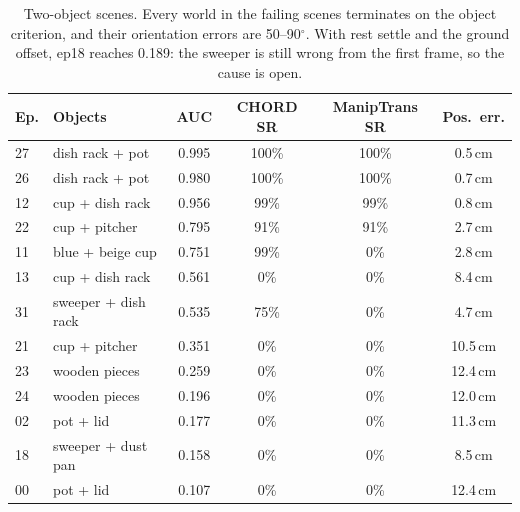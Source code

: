 \documentclass[10pt,a4paper]{article}
\begin{document}
\begin{table}[!htb]
\centering\small
\begin{tabular}{llcccc}
\toprule
Ep. & Objects & AUC & CHORD SR & ManipTrans SR & Pos.\ err.\\
\midrule
27 & dish rack + pot & \textcolor{good}{0.995} & 100\% & 100\% & 0.5\,cm\\
26 & dish rack + pot & \textcolor{good}{0.980} & 100\% & 100\% & 0.7\,cm\\
12 & cup + dish rack & \textcolor{good}{0.956} & 99\% & 99\% & 0.8\,cm\\
22 & cup + pitcher & \textcolor{good}{0.795} & 91\% & 91\% & 2.7\,cm\\
11 & blue + beige cup & 0.751 & 99\% & 0\% & 2.8\,cm\\
13 & cup + dish rack & 0.561 & 0\% & 0\% & 8.4\,cm\\
31 & sweeper + dish rack & 0.535 & 75\% & 0\% & 4.7\,cm\\
21 & cup + pitcher & 0.351 & 0\% & 0\% & 10.5\,cm\\
23 & wooden pieces & \textcolor{bad}{0.259} & 0\% & 0\% & 12.4\,cm\\
24 & wooden pieces & \textcolor{bad}{0.196} & 0\% & 0\% & 12.0\,cm\\
02 & pot + lid & \textcolor{bad}{0.177} & 0\% & 0\% & 11.3\,cm\\
18 & sweeper + dust pan & \textcolor{bad}{0.158} & 0\% & 0\% & 8.5\,cm\\
00 & pot + lid & \textcolor{bad}{0.107} & 0\% & 0\% & 12.4\,cm\\
\bottomrule
\end{tabular}
\caption{Two-object scenes. Every world in the failing scenes terminates on the object criterion, and their orientation errors are 50--90$^\circ$.
With rest settle and the ground offset, ep18 reaches 0.189: the sweeper is still wrong from the first frame, so the cause is open.}
\end{table}

\end{document}
